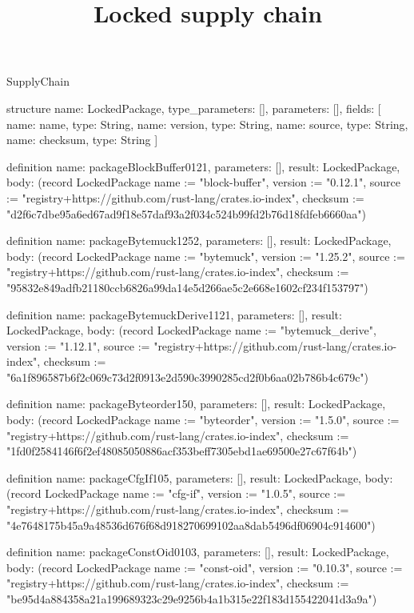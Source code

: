 \begin{lexlean}{SupplyChain}
\title{Locked supply chain}
\begin{semanticmodule}
structure{
  name: LockedPackage,
  type_parameters: [],
  parameters: [],
  fields: [
    {name: name, type: String},
    {name: version, type: String},
    {name: source, type: String},
    {name: checksum, type: String}
  ]
}

definition{
  name: packageBlockBuffer0121,
  parameters: [],
  result: LockedPackage,
  body: (record LockedPackage {name := "block-buffer", version := "0.12.1", source := "registry+https://github.com/rust-lang/crates.io-index", checksum := "d2f6c7dbe95a6ed67ad9f18e57daf93a2f034c524b99fd2b76d18fdfeb6660aa"})
}

definition{
  name: packageBytemuck1252,
  parameters: [],
  result: LockedPackage,
  body: (record LockedPackage {name := "bytemuck", version := "1.25.2", source := "registry+https://github.com/rust-lang/crates.io-index", checksum := "95832e849adfb21180ccb6826a99da14e5d266ae5c2e668e1602cf234f153797"})
}

definition{
  name: packageBytemuckDerive1121,
  parameters: [],
  result: LockedPackage,
  body: (record LockedPackage {name := "bytemuck_derive", version := "1.12.1", source := "registry+https://github.com/rust-lang/crates.io-index", checksum := "6a1f896587b6f2c069c73d2f0913e2d590c3990285cd2f0b6aa02b786b4c679c"})
}

definition{
  name: packageByteorder150,
  parameters: [],
  result: LockedPackage,
  body: (record LockedPackage {name := "byteorder", version := "1.5.0", source := "registry+https://github.com/rust-lang/crates.io-index", checksum := "1fd0f2584146f6f2ef48085050886acf353beff7305ebd1ae69500e27c67f64b"})
}

definition{
  name: packageCfgIf105,
  parameters: [],
  result: LockedPackage,
  body: (record LockedPackage {name := "cfg-if", version := "1.0.5", source := "registry+https://github.com/rust-lang/crates.io-index", checksum := "4e7648175b45a9a48536d676f68d918270699102aa8dab5496df06904c914600"})
}

definition{
  name: packageConstOid0103,
  parameters: [],
  result: LockedPackage,
  body: (record LockedPackage {name := "const-oid", version := "0.10.3", source := "registry+https://github.com/rust-lang/crates.io-index", checksum := "be95d4a884358a21a199689323c29e9256b4a1b315e22f183d155422041d3a9a"})
}


\end{semanticmodule}
\end{lexlean}
